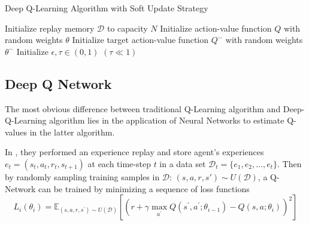 \documentclass[12pt]{article}
\begin{document}
\begin{algorithm}[t]
\caption{Deep Q-Learning Algorithm with Soft Update Strategy}\label{dql}
\LinesNumbered 
Initialize replay memory $\mathcal{D}$ to capacity $N$\; 
Initialize action-value function $Q$ with random weights $\theta$\; 
Initialize target action-value function $Q^{-}$ with random weights $\theta^{-}$\; 
Initialize $\epsilon, \tau \in (0, 1)$ $ (  \tau \ll 1 ) $ \; 
\end{algorithm}

\subsection{Deep Q Network}
The most obvious difference between traditional Q-Learning algorithm and Deep-Q-Learning algorithm lies in the application of Neural Networks to estimate Q-values in the latter algorithm.

In \cite{DBLP:journals/corr/MnihKSGAWR13}, they performed an experience replay and store agent's experiences $e_t=(s_t,a_t,r_t,s_{t+1})$ at each time-step $t$ in a data set $\mathcal{D}_t = \{e_1, e_2, \dots, e_t\}$. Then by randomly sampling training samples in $\mathcal{D}$: $(s,a,r,s') \sim U(\mathcal{D})$, a Q-Network can be trained by minimizing a sequence of loss functions 
\begin{equation}
L_{i}\left(\theta_{i}\right)=\mathbb{E}_{\left(s, a, r, s^{\prime}\right) \sim U(\mathcal{D})}\left[\left(r+\gamma \max _{a^{\prime}} Q\left(s^{\prime}, a^{\prime} ; \theta_{i-1}\right)-Q\left(s, a ; \theta_{i}\right)\right)^{2}\right]  
\end{equation}
\end{document}
